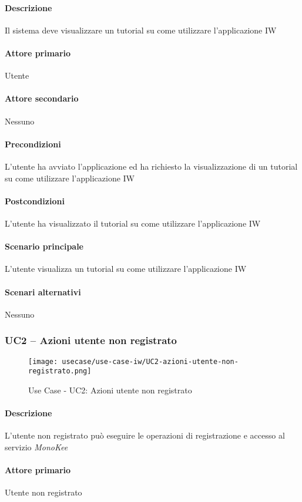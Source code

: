 \paragraph{Descrizione}  Il sistema deve visualizzare un tutorial su come utilizzare l’applicazione IW
\paragraph{Attore primario}  Utente
\paragraph{Attore secondario}  Nessuno
\paragraph{Precondizioni}  L’utente ha avviato l’applicazione ed ha richiesto la visualizzazione di un tutorial su come utilizzare l’applicazione IW
\paragraph{Postcondizioni}  L’utente ha visualizzato il tutorial su come utilizzare l’applicazione IW
\paragraph{Scenario principale}  
L’utente visualizza un tutorial su come utilizzare l’applicazione IW
\paragraph{Scenari alternativi}  Nessuno


\subsubsection{UC2 – Azioni utente non registrato}
\begin{figure}[!htbp] 
    \centering 
    \texttt{[image: usecase/use-case-iw/UC2-azioni-utente-non-registrato.png]} 
    \caption{Use Case - UC2: Azioni utente non registrato}
\end{figure}

\paragraph{Descrizione}  L’utente non registrato può eseguire le operazioni di registrazione e accesso al servizio \textit{MonoKee} 
\paragraph{Attore primario}  Utente non registrato
